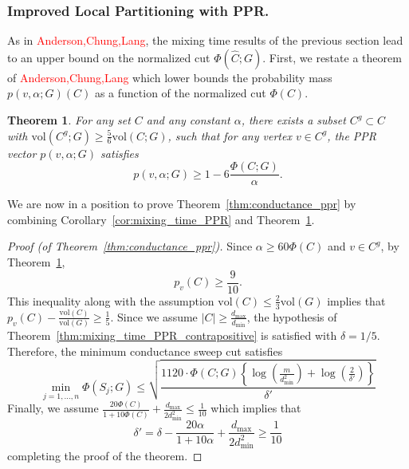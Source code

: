 \documentclass[11pt,twoside]{article}
\newtheorem{theorem}{Theorem}
\newcommand{\vol}{\mathrm{vol}}
\newcommand{\abs}[1]{\left \lvert #1 \right \rvert}
\newcommand{\1}{\mathbf{1}}
\begin{document}
\subsubsection{Improved Local Partitioning with PPR.}

As in \textcolor{red}{Anderson,Chung,Lang}, the mixing time results of the previous section lead to an upper bound on the normalized cut $\Phi(\widehat{C};G)$. First, we restate a theorem of \textcolor{red}{Anderson,Chung,Lang} which lower bounds the probability mass $p(v,\alpha;G)(C)$ as a function of the normalized cut $\Phi(C)$. 

\begin{theorem}
	\label{thm:acl_3}
	For any set $C$ and any constant $\alpha$, there exists a subset $C^g \subset C$ with $\vol(C^g;G) \geq \frac{5}{6}\vol(C;G)$, such that for any vertex $v \in C^g$, the PPR vector $p(v,\alpha;G)$ satisfies
	\begin{equation*}
	p(v,\alpha;G) \geq 1 - 6\frac{\Phi(C;G)}{\alpha}.
	\end{equation*}
\end{theorem}
We are now in a position to prove Theorem~\ref{thm:conductance_ppr} by combining Corollary~\ref{cor:mixing_time_PPR} and Theorem~\ref{thm:acl_3}.

\begin{proof}[Proof (of Theorem~\ref{thm:conductance_ppr})]
	Since $\alpha \geq 60\Phi(C)$ and $v \in C^g$, by Theorem~\ref{thm:acl_3},
	\begin{equation*}
	p_v(C) \geq \frac{9}{10}.
	\end{equation*}
	This inequality along with the assumption $\vol(C) \leq \frac{2}{3}\vol(G)$ implies that $p_v(C) - \frac{\vol(C)}{\vol(G)} \geq \frac{1}{5}$. Since we assume $\abs{C} \geq \frac{d_{\max}}{d_{\min}}$, the hypothesis of Theorem~\ref{thm:mixing_time_PPR_contrapositive} is satisfied with $\delta = 1/5$. Therefore, the minimum conductance sweep cut satisfies
	\begin{equation*}
	\min_{j = 1,\ldots,n} \Phi(S_j;G) \leq \sqrt{\frac{1120\cdot \Phi(C;G)\left\{\log\left(\frac{m}{d_{\min}^2}\right) + \log\left(\frac{2}{\delta'}\right)\right\}}{\delta'}}
	\end{equation*}
	Finally, we assume $\frac{20\Phi(C)}{1 + 10\Phi(C)} + \frac{d_{\max}}{2d_{\min}^2} \leq \frac{1}{10}$ which implies that
	\begin{equation*}
	\delta' = \delta - \frac{20\alpha}{1 + 10\alpha} + \frac{d_{\max}}{2d_{\min}^2} \geq \frac{1}{10} 
	\end{equation*}
	completing the proof of the theorem.
\end{proof}
\end{document}
